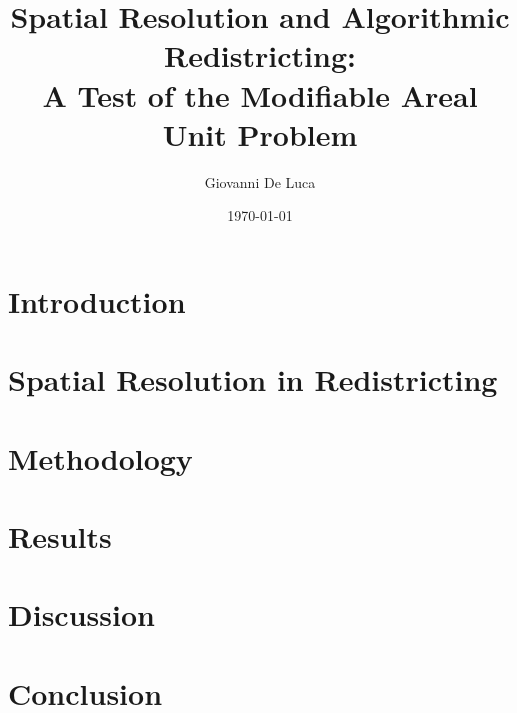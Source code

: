 \documentclass[12pt]{article}
\title{Spatial Resolution and Algorithmic Redistricting: \\
A Test of the Modifiable Areal Unit Problem}
\author{Giovanni De Luca}
\date{\today}
\begin{document}
\maketitle

\begin{abstract}

\end{abstract}

\section{Introduction}


\section{Spatial Resolution in Redistricting}


\section{Methodology}


\section{Results}


\section{Discussion}


\section{Conclusion}




\end{document}
